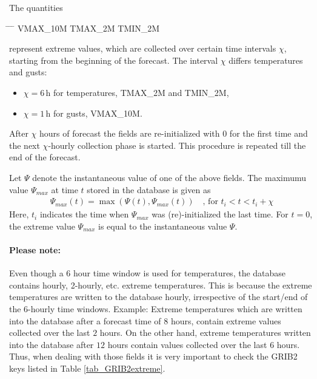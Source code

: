The quantities
\begin{note}
\begin{tabbing}
  \hspace{0.2\textwidth} \= \hspace{0.2\textwidth} \= \hspace{0.2\textwidth} \= \hspace{0.2\textwidth} \kill
  VMAX\_10M \>
  TMAX\_2M \>
  TMIN\_2M 
\end{tabbing}
\end{note}
represent extreme values, which are collected over certain time intervals $\chi$, starting from the beginning of the forecast.
The interval $\chi$ differs temperatures and gusts:
\begin{itemize}
  \item $\chi=6\,\mathrm{h}$ for temperatures, TMAX\_2M and TMIN\_2M,
  \item $\chi=1\,\mathrm{h}$ for gusts, VMAX\_10M.
\end{itemize}
After $\chi$ hours of forecast the fields are re-initialized with $0$ for the first time and the next $\chi$-hourly collection 
phase is started. This procedure is repeated till the end of the forecast.

Let $\Psi$ denote the instantaneous value of one of the above fields. The maximumu value $\Psi_{max}$ at time $t$ stored in the 
database is given as
\begin{align*}
 \Psi_{max}(t) = \max(\Psi(t),\Psi_{max}(t))  \quad \text{, for } t_{i}<t<t_{i}+\chi
\end{align*}
Here, $t_{i}$ indicates the time when $\Psi_{max}$ was (re)-initialized the last time. For $t=0$, the extreme value $\Psi_{max}$ 
is equal to the instantaneous value $\Psi$. 

\paragraph{Please note:} Even though a 6 hour time window is used for temperatures, the database contains hourly, 2-hourly, etc.        
extreme temperatures. This is because the extreme temperatures are written to the database hourly, irrespective of the 
start/end of the 6-hourly time windows. Example: Extreme temperatures which are written into the database after a 
forecast time of $8$ hours, contain extreme values collected over the last $2$ hours. On the other hand, extreme temperatures
written into the database after $12$ hours contain values collected over the last $6$ hours.
Thus, when dealing with those fields it is very important to check the GRIB2 keys listed in Table \ref{tab_GRIB2extreme}.

